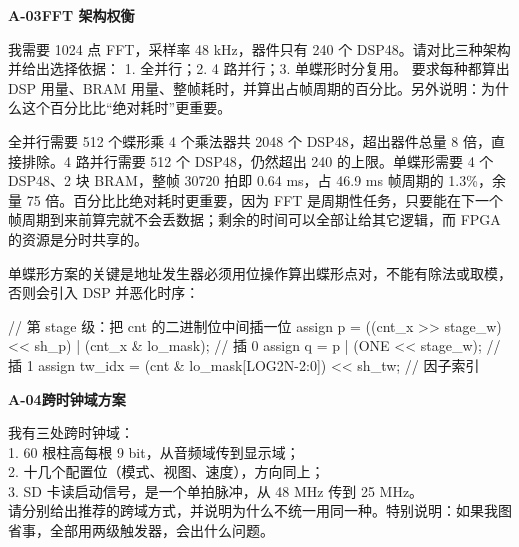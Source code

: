 \documentclass[withoutpreface,bwprint]{cumcmthesis}
\newcommand{\aichat}[2]{%
  \par\vspace{1.0em}%
  \noindent\textbf{\zihao{-4}#1\quad #2}\par
  \vspace{0.6em}%
}
\begin{document}
\aichat{A-03}{FFT 架构权衡}

\begin{tcolorbox}[title=\textbf{用户提示词}, colback=blue!2!white,
                  colframe=blue!30!black, fonttitle=\bfseries, breakable]
我需要 1024 点 FFT，采样率 48 kHz，器件只有 240 个 DSP48。请对比三种架构并给出选择依据：
1. 全并行；2. 4 路并行；3. 单蝶形时分复用。
要求每种都算出 DSP 用量、BRAM 用量、整帧耗时，并算出占帧周期的百分比。另外说明：为什么这个百分比比“绝对耗时”更重要。
\end{tcolorbox}

\begin{tcolorbox}[title=\textbf{AI 回答要点}, colback=green!2!white,
                  colframe=green!30!black, fonttitle=\bfseries, breakable]
全并行需要 512 个蝶形乘 4 个乘法器共 2048 个 DSP48，超出器件总量 8 倍，直接排除。4 路并行需要 512 个 DSP48，仍然超出 240 的上限。单蝶形需要 4 个 DSP48、2 块 BRAM，整帧 30720 拍即 0.64 ms，占 46.9 ms 帧周期的 1.3\%，余量 75 倍。百分比比绝对耗时更重要，因为 FFT 是周期性任务，只要能在下一个帧周期到来前算完就不会丢数据；剩余的时间可以全部让给其它逻辑，而 FPGA 的资源是分时共享的。

单蝶形方案的关键是地址发生器必须用位操作算出蝶形点对，不能有除法或取模，否则会引入 DSP 并恶化时序：

\begin{ai_verilog}
// 第 stage 级：把 cnt 的二进制位中间插一位
assign p = ((cnt_x >> stage_w) << sh_p) | (cnt_x & lo_mask);  // 插 0
assign q = p | (ONE << stage_w);                             // 插 1
assign tw_idx = (cnt & lo_mask[LOG2N-2:0]) << sh_tw;         // 因子索引
\end{ai_verilog}
\end{tcolorbox}


\aichat{A-04}{跨时钟域方案}

\begin{tcolorbox}[title=\textbf{用户提示词}, colback=blue!2!white,
                  colframe=blue!30!black, fonttitle=\bfseries, breakable]
我有三处跨时钟域：\\
1. 60 根柱高每根 9 bit，从音频域传到显示域；\\
2. 十几个配置位（模式、视图、速度），方向同上；\\
3. SD 卡读启动信号，是一个单拍脉冲，从 48 MHz 传到 25 MHz。\\
请分别给出推荐的跨域方式，并说明为什么不统一用同一种。特别说明：如果我图省事，全部用两级触发器，会出什么问题。
\end{tcolorbox}
\end{document}
